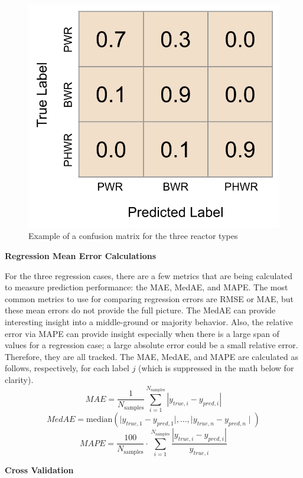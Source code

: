 \begin{figure}[!htb]
  \centering
  \includegraphics[width=0.4\linewidth]{./chapters/litrev/cm_example.png}
  \caption[Example of a confusion matrix]
          {Example of a confusion matrix for the three reactor types}
  \label{fig:cm_ex}
\end{figure}

\noindent \textbf{Regression Mean Error Calculations}

For the three regression cases, there are a few metrics that are being
calculated to measure prediction performance: the \gls{MAE}, \gls{MedAE}, and
\gls{MAPE}. The most common metrics to use for comparing regression errors are
\gls{RMSE} or \gls{MAE}, but these mean errors do not provide the full picture.
The \gls{MedAE} can provide interesting insight into a middle-ground or
majority behavior. Also, the relative error via \gls{MAPE} can provide insight
especially when there is a large span of values for a regression case; a large
absolute error could be a small relative error. Therefore, they are all
tracked.  The \gls{MAE}, \gls{MedAE}, and \gls{MAPE} are calculated as follows,
respectively, for each label $j$ (which is suppressed in the math below for
clarity).
\begin{equation}
  \textit{MAE} = \frac{1}{N_{\text{samples}}} \sum_{i=1}^{N_{\text{samples}}} 
                 \left| y_{true, i} - y_{pred, i} \right|
\end{equation}
\begin{equation}
  \textit{MedAE} = \text{median}(\mid y_{true, 1} - y_{pred, 1} \mid, \ldots, 
                                 \mid y_{true, n} - y_{pred, n} \mid)
\end{equation}
\begin{equation}
  \textit{MAPE} =  \frac{100}{N_{\text{samples}}} \cdot 
                   \sum_{i=1}^{N_{\text{samples}}}
                   \frac{\left| y_{true, i} - y_{pred, i} \right|}{y_{true, i}}
\end{equation}

\noindent \textbf{Cross Validation}

